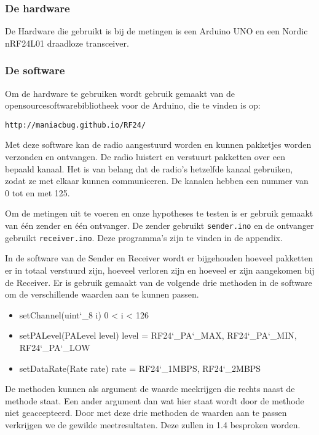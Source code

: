 \documentclass{article}
\begin{document}
\subsubsection{De hardware}
De Hardware die gebruikt is bij de metingen is een Arduino UNO en een Nordic nRF24L01 draadloze transceiver.\\

\subsubsection{De software}
Om de hardware te gebruiken wordt gebruik gemaakt van de opensourcesoftwarebibliotheek voor de Arduino, die te vinden is op: \begin{verbatim}http://maniacbug.github.io/RF24/ \end{verbatim} 

Met deze software kan de radio aangestuurd worden en kunnen pakketjes worden verzonden en ontvangen. De radio luistert en verstuurt pakketten over een bepaald kanaal. Het is van belang dat de radio's hetzelfde kanaal gebruiken, zodat ze met elkaar kunnen communiceren. De kanalen hebben een nummer van 0 tot en met 125. 

Om de metingen uit te voeren en onze hypotheses te testen is er gebruik gemaakt van \'{e}\'{e}n zender en \'{e}\'{e}n ontvanger. De zender gebruikt \texttt{sender.ino} en de ontvanger gebruikt \texttt{receiver.ino}. Deze programma's zijn te vinden in de appendix.

In de software van de Sender en Receiver wordt er bijgehouden hoeveel pakketten er in totaal verstuurd zijn, hoeveel verloren zijn en hoeveel er zijn aangekomen bij de Receiver. Er is gebruik gemaakt van de volgende drie methoden in de software om de verschillende waarden aan te kunnen passen. 
\begin{itemize}
	\item setChannel(uint\char`_8 i)  0 < i < 126
	\item setPALevel(PALevel level) level = RF24\char`_PA\char`_MAX, RF24\char`_PA\char`_MIN, RF24\char`_PA\char`_LOW 
	\item setDataRate(Rate rate) rate = RF24\char`_1MBPS, RF24\char`_2MBPS
\end{itemize}
De methoden kunnen als argument de waarde meekrijgen die rechts naast de methode staat. Een ander argument dan wat hier staat wordt door de methode niet geaccepteerd. 
Door met deze drie methoden de waarden aan te passen verkrijgen we de gewilde meetresultaten. Deze zullen in 1.4 besproken worden.\\
\end{document}
